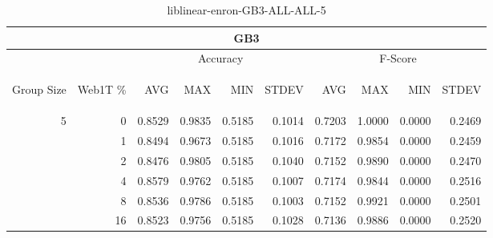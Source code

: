 \begin{center}
\begin{table}[htbp] 
 \begin{center}
\begin{tabular}{ | r | r | r | r | r | r | r | r | r | r |}
\hline
\multicolumn{10}{|c|}{GB3}\\
\hline
 & & \multicolumn{4}{|c|}{Accuracy} & \multicolumn{4}{|c|}{F-Score}\\ \cline{3-10}
\begin{sideways}Group Size\end{sideways} & \begin{sideways}Web1T \%\end{sideways} & \begin{sideways}AVG\end{sideways} & \begin{sideways}MAX\end{sideways} & \begin{sideways}MIN\end{sideways} & \begin{sideways}STDEV\end{sideways} & \begin{sideways}AVG\end{sideways} & \begin{sideways}MAX\end{sideways} & \begin{sideways}MIN\end{sideways} & \begin{sideways}STDEV\end{sideways}\\
\hline
\multirow{5}{*}{5}
 & 0 & 0.8529 & 0.9835 & 0.5185 & 0.1014 & 0.7203 & 1.0000 & 0.0000 & 0.2469\\ \cline{2-10}
 & 1 & 0.8494 & 0.9673 & 0.5185 & 0.1016 & 0.7172 & 0.9854 & 0.0000 & 0.2459\\ \cline{2-10}
 & 2 & 0.8476 & 0.9805 & 0.5185 & 0.1040 & 0.7152 & 0.9890 & 0.0000 & 0.2470\\ \cline{2-10}
 & 4 & 0.8579 & 0.9762 & 0.5185 & 0.1007 & 0.7174 & 0.9844 & 0.0000 & 0.2516\\ \cline{2-10}
 & 8 & 0.8536 & 0.9786 & 0.5185 & 0.1003 & 0.7152 & 0.9921 & 0.0000 & 0.2501\\ \cline{2-10}
 & 16 & 0.8523 & 0.9756 & 0.5185 & 0.1028 & 0.7136 & 0.9886 & 0.0000 & 0.2520\\ \cline{2-10}
\hline
\end{tabular}
\caption{liblinear-enron-GB3-ALL-ALL-5}
\label{table:liblinear-enron-GB3-ALL-ALL-5}
\end{center}
 \end{table}
\end{center}

